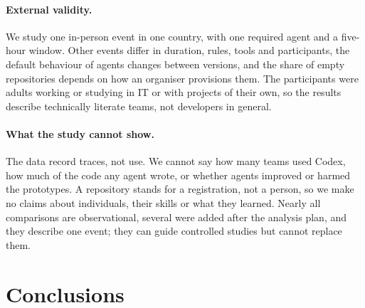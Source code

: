 \documentclass{article}
\begin{document}
\paragraph{External validity.} We study one in-person event in one country, with one required agent and a five-hour window. Other events differ in duration, rules, tools and participants, the default behaviour of agents changes between versions, and the share of empty repositories depends on how an organiser provisions them. The participants were adults working or studying in IT or with projects of their own, so the results describe technically literate teams, not developers in general.

\paragraph{What the study cannot show.} The data record traces, not use. We cannot say how many teams used Codex, how much of the code any agent wrote, or whether agents improved or harmed the prototypes. A repository stands for a registration, not a person, so we make no claims about individuals, their skills or what they learned. Nearly all comparisons are observational, several were added after the analysis plan, and they describe one event; they can guide controlled studies but cannot replace them.

\section{Conclusions}\label{sec:conclusion}
\end{document}
